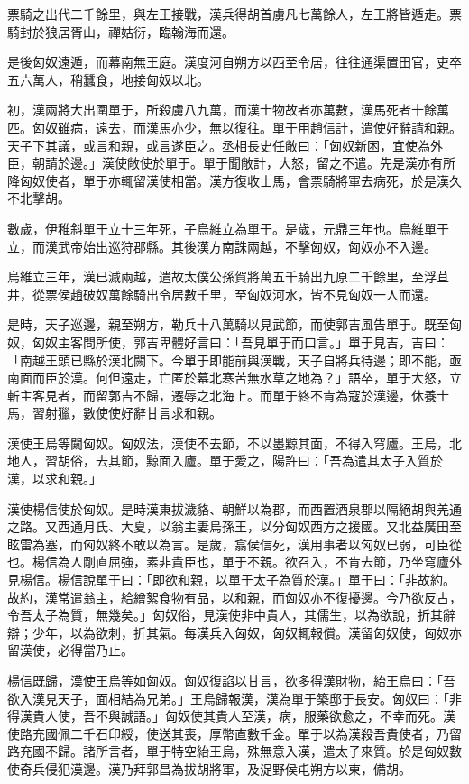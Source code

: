 \begin{pinyinscope}
票騎之出代二千餘里，與左王接戰，漢兵得胡首虜凡七萬餘人，左王將皆遁走。票騎封於狼居胥山，禪姑衍，臨翰海而還。

是後匈奴遠遁，而幕南無王庭。漢度河自朔方以西至令居，往往通渠置田官，吏卒五六萬人，稍蠶食，地接匈奴以北。

初，漢兩將大出圍單于，所殺虜八九萬，而漢士物故者亦萬數，漢馬死者十餘萬匹。匈奴雖病，遠去，而漢馬亦少，無以復往。單于用趙信計，遣使好辭請和親。天子下其議，或言和親，或言遂臣之。丞相長史任敞曰：「匈奴新困，宜使為外臣，朝請於邊。」漢使敞使於單于。單于聞敞計，大怒，留之不遣。先是漢亦有所降匈奴使者，單于亦輒留漢使相當。漢方復收士馬，會票騎將軍去病死，於是漢久不北擊胡。

數歲，伊稚斜單于立十三年死，子烏維立為單于。是歲，元鼎三年也。烏維單于立，而漢武帝始出巡狩郡縣。其後漢方南誅兩越，不擊匈奴，匈奴亦不入邊。

烏維立三年，漢已滅兩越，遣故太僕公孫賀將萬五千騎出九原二千餘里，至浮苴井，從票侯趙破奴萬餘騎出令居數千里，至匈奴河水，皆不見匈奴一人而還。

是時，天子巡邊，親至朔方，勒兵十八萬騎以見武節，而使郭吉風告單于。既至匈奴，匈奴主客問所使，郭吉卑體好言曰：「吾見單于而口言。」單于見吉，吉曰：「南越王頭已縣於漢北闕下。今單于即能前與漢戰，天子自將兵待邊；即不能，亟南面而臣於漢。何但遠走，亡匿於幕北寒苦無水草之地為？」語卒，單于大怒，立斬主客見者，而留郭吉不歸，遷辱之北海上。而單于終不肯為寇於漢邊，休養士馬，習射獵，數使使好辭甘言求和親。

漢使王烏等闚匈奴。匈奴法，漢使不去節，不以墨黥其面，不得入穹廬。王烏，北地人，習胡俗，去其節，黥面入廬。單于愛之，陽許曰：「吾為遣其太子入質於漢，以求和親。」

漢使楊信使於匈奴。是時漢東拔濊貉、朝鮮以為郡，而西置酒泉郡以隔絕胡與羌通之路。又西通月氏、大夏，以翁主妻烏孫王，以分匈奴西方之援國。又北益廣田至眩雷為塞，而匈奴終不敢以為言。是歲，翕侯信死，漢用事者以匈奴已弱，可臣從也。楊信為人剛直屈強，素非貴臣也，單于不親。欲召入，不肯去節，乃坐穹廬外見楊信。楊信說單于曰：「即欲和親，以單于太子為質於漢。」單于曰：「非故約。故約，漢常遣翁主，給繒絮食物有品，以和親，而匈奴亦不復擾邊。今乃欲反古，令吾太子為質，無幾矣。」匈奴俗，見漢使非中貴人，其儒生，以為欲說，折其辭辯；少年，以為欲刺，折其氣。每漢兵入匈奴，匈奴輒報償。漢留匈奴使，匈奴亦留漢使，必得當乃止。

楊信既歸，漢使王烏等如匈奴。匈奴復諂以甘言，欲多得漢財物，紿王烏曰：「吾欲入漢見天子，面相結為兄弟。」王烏歸報漢，漢為單于築邸于長安。匈奴曰：「非得漢貴人使，吾不與誠語。」匈奴使其貴人至漢，病，服藥欲愈之，不幸而死。漢使路充國佩二千石印綬，使送其喪，厚幣直數千金。單于以為漢殺吾貴使者，乃留路充國不歸。諸所言者，單于特空紿王烏，殊無意入漢，遣太子來質。於是匈奴數使奇兵侵犯漢邊。漢乃拜郭昌為拔胡將軍，及浞野侯屯朔方以東，備胡。


\end{pinyinscope}

